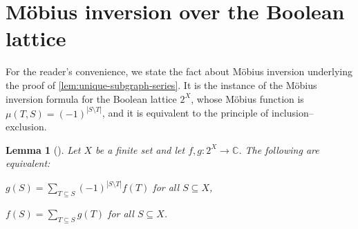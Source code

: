 \documentclass[11pt]{scrartcl}
\theoremstyle{definition}
\theoremstyle{plain}
\newtheorem{lemma}[definition]{Lemma}
\theoremstyle{remark}
\begin{document}
    \appendix
    	
    
    \section{Möbius inversion over the Boolean lattice}
    \label{sec:mobius}

	For the reader's convenience, we state the fact about Möbius inversion
	underlying the proof of \cref{lem:unique-subgraph-series}.
	It is the instance of the Möbius inversion formula
	\cite[Proposition~3.7.1]{stanley_enumerative_2012}
	for the Boolean lattice $2^X$,
	whose Möbius function is $\mu(T, S) = (-1)^{|S \setminus T|}$,
	and it is equivalent to the principle of inclusion--exclusion.

	\begin{lemma}[{\cite[Example~3.8.3]{stanley_enumerative_2012}}]\label{lem:mobius-inversion}
		Let $X$ be a finite set and let $f, g \colon 2^X \to \mathbb{C}$.
		The following are equivalent:
		\begin{assertions}
			\item\label{it:mobius-down} $g(S) = \sum_{T \subseteq S} (-1)^{|S \setminus T|} f(T)$ for all $S \subseteq X$,
			\item\label{it:mobius-up} $f(S) = \sum_{T \subseteq S} g(T)$ for all $S \subseteq X$.
		\end{assertions}
	\end{lemma}


   
    
	\printbibliography
\end{document}

